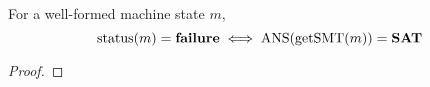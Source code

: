 \begin{lemma}
For a well-formed machine state $m$,
\[
\mathrm{status}(m) = \textbf{failure} \iff \mathrm{ANS}(\mathrm{getSMT}(m)) = \mathrm{\textbf{SAT}}
\]
\label{lemma:1}
\end{lemma}
\begin{proof}


\end{proof}
